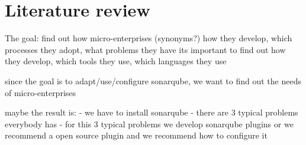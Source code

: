 \chapter{Literature review}
\label{sec:Literature}

The goal: find out how micro-enterprises (synonyms?) how they develop, which processes they adopt, what problems they have 
its important to find out how they develop, which tools they use, which languages they use

since the goal is to adapt/use/configure sonarqube, we want to find out the needs of micro-enterprises

maybe the result is:
- we have to install sonarqube
- there are 3 typical problems everybody has
- for this 3 typical problems we develop sonarqube plugins or we recommend a open source plugin and we recommend how to configure it

